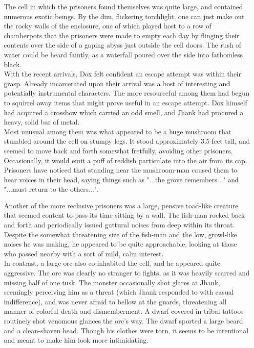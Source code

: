 \documentclass[letterpaper,10pt,twoside,twocolumn,openany]{book}
\begin{document}
The cell in which the prisoners found themselves was quite large, and contained numerous exotic beings. By the dim, flickering torchlight, one can just make out the rocky walls of the enclosure, one of which played host to a row of chamberpots that the prisoners were made to empty each day by flinging their contents over the side of a gaping abyss just outside the cell doors. The rush of water could be heard faintly, as a waterfall poured over the side into fathomless black.\\

With the recent arrivals, Dox felt confident an escape attempt was within their grasp. Already incarcerated upon their arrival was a host of interesting and potentially instrumental characters. The more resourceful among them had begun to squirrel away items that might prove useful in an escape attempt. Dox himself had acquired a crossbow which carried an odd smell, and Jhank had procured a heavy, solid bar of metal.\\

Most unusual among them was what appeared to be a huge mushroom that stumbled around the cell on stumpy legs. It stood approximately 3.5 feet tall, and seemed to move back and forth somewhat fretfully, avoiding other prisoners. Occasionally, it would emit a puff of reddish particulate into the air from its cap. Prisoners have noticed that standing near the mushroom-man caused them to hear voices in their head, saying things such as "...the grove remembers..." and "...must return to the others...".

Another of the more reclusive prisoners was a large, pensive toad-like creature that seemed content to pass its time sitting by a wall. The fish-man rocked back and forth and periodically issued guttural noises from deep within its throat. Despite the somewhat threatening size of the fish-man and the low, growl-like noises he was making, he appeared to be quite approachable, looking at those who passed nearby with a sort of mild, calm interest.\\

In contrast, a large orc also co-inhabited the cell, and he appeared quite aggressive. The orc was clearly no stranger to fights, as it was heavily scarred and missing half of one tusk. The monster occasionally shot glares at Jhank, seemingly perceiving him as a threat (which Jhank responded to with casual indifference), and was never afraid to bellow at the guards, threatening all manner of colorful death and dismemberment. A dwarf covered in tribal tattoos routinely shot venomous glances the orc's way. The dwarf sported a large beard and a clean-shaven head. Though his clothes were torn, it seems to be intentional and meant to make him look more intimidating.\\
\end{document}

